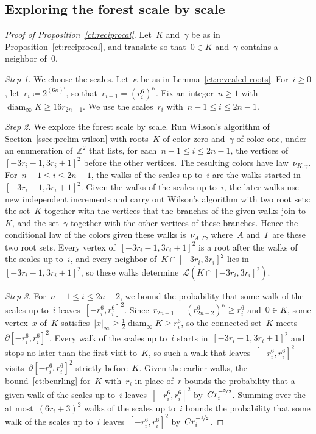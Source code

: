 \documentclass[11pt]{amsart}
\numberwithin{equation}{section}
\newcommand{\Z}{\mathbb Z}
\newcommand{\nf}{\nicefrac}
\newcommand{\cL}{\mathscr{L}}
\DeclareMathOperator{\diam}{diam}
\begin{document}
\subsection{Exploring the forest scale by scale}

\begin{proof}[Proof of Proposition~\ref{ct:reciprocal}]
Let~$K$ and~$\gamma$ be as in Proposition~\ref{ct:reciprocal}, and translate so that~$0\in K$ and~$\gamma$ contains a neighbor of~$0$.

\emph{Step 1.} We choose the scales. Let~$\kappa$ be as in Lemma~\ref{ct:revealed-roots}. For~$i\geq0$, let~$r_i\coloneqq2^{(6\kappa)^i}$, so that~$r_{i+1}=(r_i^6)^\kappa$. Fix an integer~$n\geq1$ with~$\diam_\infty K\geq16r_{2n-1}$. We use the scales~$r_i$ with~$n-1\leq i\leq2n-1$.

\emph{Step 2.} We explore the forest scale by scale. Run Wilson's algorithm of Section~\ref{ssec:prelim-wilson} with roots~$K$ of color zero and~$\gamma$ of color one, under an enumeration of~$\Z^2$ that lists, for each~$n-1\leq i\leq2n-1$, the vertices of~$[-3r_i-1,3r_i+1]^2$ before the other vertices. The resulting colors have law~$\nu_{K,\gamma}$. For~$n-1\leq i\leq2n-1$, the walks of the scales up to~$i$ are the walks started in~$[-3r_i-1,3r_i+1]^2$. Given the walks of the scales up to~$i$, the later walks use new independent increments and carry out Wilson's algorithm with two root sets: the set~$K$ together with the vertices that the branches of the given walks join to~$K$, and the set~$\gamma$ together with the other vertices of these branches. Hence the conditional law of the colors given these walks is~$\nu_{A,\Gamma}$, where~$A$ and~$\Gamma$ are these two root sets. Every vertex of~$[-3r_i-1,3r_i+1]^2$ is a root after the walks of the scales up to~$i$, and every neighbor of~$K\cap [-3r_i,3r_i]^2$ lies in~$[-3r_i-1,3r_i+1]^2$, so these walks determine~$\cL(K\cap [-3r_i,3r_i]^2)$.

\emph{Step 3.} For~$n-1\leq i\leq2n-2$, we bound the probability that some walk of the scales up to~$i$ leaves~$[-r_i^6,r_i^6]^2$. Since~$r_{2n-1}=(r_{2n-2}^6)^\kappa\geq r_i^6$ and~$0\in K$, some vertex~$x$ of~$K$ satisfies~$|x|_\infty\geq\tfrac12\diam_\infty K\geq r_i^6$, so the connected set~$K$ meets~$\partial[-r_i^6,r_i^6]^2$. Every walk of the scales up to~$i$ starts in~$[-3r_i-1,3r_i+1]^2$ and stops no later than the first visit to~$K$, so such a walk that leaves~$[-r_i^6,r_i^6]^2$ visits~$\partial[-r_i^6,r_i^6]^2$ strictly before~$K$. Given the earlier walks, the bound~\eqref{ct:beurling} for~$K$ with~$r_i$ in place of~$r$ bounds the probability that a given walk of the scales up to~$i$ leaves~$[-r_i^6,r_i^6]^2$ by~$Cr_i^{-\nf52}$. Summing over the at most~$(6r_i+3)^2$ walks of the scales up to~$i$ bounds the probability that some walk of the scales up to~$i$ leaves~$[-r_i^6,r_i^6]^2$ by~$Cr_i^{-\nf12}$.


\end{proof}
\end{document}
